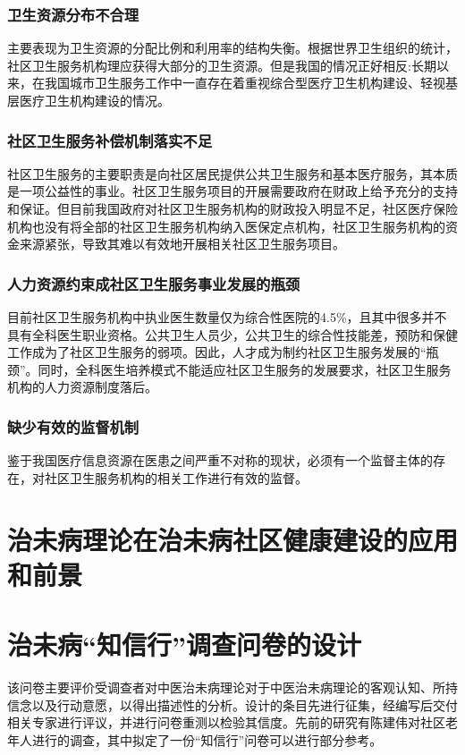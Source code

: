 \subsubsection{卫生资源分布不合理}
主要表现为卫生资源的分配比例和利用率的结构失衡。根据世界卫生组织的统计，社区卫生服务机构理应获得大部分的卫生资源。但是我国的情况正好相反:长期以来，在我国城市卫生服务工作中一直存在着重视综合型医疗卫生机构建设、轻视基层医疗卫生机构建设的情况。
\subsubsection{社区卫生服务补偿机制落实不足}
社区卫生服务的主要职责是向社区居民提供公共卫生服务和基本医疗服务，其本质是一项公益性的事业。社区卫生服务项目的开展需要政府在财政上给予充分的支持和保证。但目前我国政府对社区卫生服务机构的财政投入明显不足，社区医疗保险机构也没有将全部的社区卫生服务机构纳入医保定点机构，社区卫生服务机构的资金来源紧张，导致其难以有效地开展相关社区卫生服务项目。
\subsubsection{人力资源约束成社区卫生服务事业发展的瓶颈}
目前社区卫生服务机构中执业医生数量仅为综合性医院的4.5\%，且其中很多并不具有全科医生职业资格。公共卫生人员少，公共卫生的综合性技能差，预防和保健工作成为了社区卫生服务的弱项。因此，人才成为制约社区卫生服务发展的“瓶颈”。同时，全科医生培养模式不能适应社区卫生服务的发展要求，社区卫生服务机构的人力资源制度落后。
\subsubsection{缺少有效的监督机制}
鉴于我国医疗信息资源在医患之间严重不对称的现状，必须有一个监督主体的存在，对社区卫生服务机构的相关工作进行有效的监督。
\section{治未病理论在治未病社区健康建设的应用和前景}

\section{治未病“知信行”调查问卷的设计}
该问卷主要评价受调查者对中医治未病理论对于中医治未病理论的客观认知、所持信念以及行动意愿，以得出描述性的分析。设计的条目先进行征集，经编写后交付相关专家进行评议，并进行问卷重测以检验其信度。先前的研究有陈建伟对社区老年人进行的调查\cite{cjw_1_2009}，其中拟定了一份“知信行”问卷可以进行部分参考。
